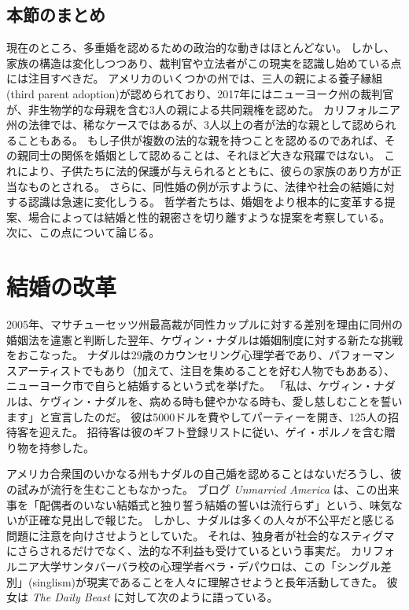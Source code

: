 \documentclass[paper=a4,book,openany]{jlreq}
\begin{document}
\subsection{本節のまとめ}

現在のところ、多重婚を認めるための政治的な動きはほとんどない。
しかし、家族の構造は変化しつつあり、裁判官や立法者がこの現実を認識し始めている点には注目すべきだ。
アメリカのいくつかの州では、三人の親による養子縁組(third parent adoption)が認められており、2017年にはニューヨーク州の裁判官が、非生物学的な母親を含む3人の親による共同親権を認めた。
カリフォルニア州の法律では、稀なケースではあるが、3人以上の者が法的な親として認められることもある。
もし子供が複数の法的な親を持つことを認めるのであれば、その親同士の関係を婚姻として認めることは、それほど大きな飛躍ではない。
これにより、子供たちに法的保護が与えられるとともに、彼らの家族のあり方が正当なものとされる。
さらに、同性婚の例が示すように、法律や社会の結婚に対する認識は急速に変化しうる。
哲学者たちは、婚姻をより根本的に変革する提案、場合によっては結婚と性的親密さを切り離すような提案を考察している。
次に、この点について論じる。

\section{結婚の改革}

2005年、マサチューセッツ州最高裁が同性カップルに対する差別を理由に同州の婚姻法を違憲と判断した翌年、ケヴィン・ナダルは婚姻制度に対する新たな挑戦をおこなった。
ナダルは29歳のカウンセリング心理学者であり、パフォーマンスアーティストでもあり（加えて、注目を集めることを好む人物でもあある）、ニューヨーク市で自らと結婚するという式を挙げた。
「私は、ケヴィン・ナダルは、ケヴィン・ナダルを、病める時も健やかなる時も、愛し慈しむことを誓います」と宣言したのだ。
彼は5000ドルを費やしてパーティーを開き、125人の招待客を迎えた。
招待客は彼のギフト登録リストに従い、ゲイ・ポルノを含む贈り物を持参した\citep{krum05:_man_who_married_himsel}。

アメリカ合衆国のいかなる州もナダルの自己婚を認めることはないだろうし、彼の試みが流行を生むこともなかった。
ブログ \emph{Unmarried America} は、この出来事を「配偶者のいない結婚式と独り誓う結婚の誓いは流行らず」という、味気ないが正確な見出しで報じた\citep{coleman07:_spous_weddin_solo_vows_not_catch}。
しかし、ナダルは多くの人々が不公平だと感じる問題に注意を向けさせようとしていた。
それは、独身者が社会的なスティグマにさらされるだけでなく、法的な不利益も受けているという事実だ。
カリフォルニア大学サンタバーバラ校の心理学者ベラ・デパウロは、この「シングル差別」(singlism)が現実であることを人々に理解させようと長年活動してきた。
彼女は \emph{The Daily Beast} に対して次のように語っている。
\end{document}
